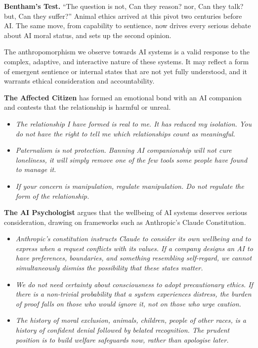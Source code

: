 \medskip
\noindent\textbf{Bentham's Test.} ``The question is not, Can they
reason? nor, Can they talk? but, Can they
suffer?''\cite{bentham1789principles} Animal ethics arrived at this
pivot two centuries before AI. The same move, from capability to
sentience, now drives every serious debate about AI moral status, and
sets up the second opinion.

\quad The anthropomorphism we
observe towards AI systems is a valid response to the complex, adaptive,
and interactive nature of these systems. It may reflect a form of emergent
sentience or internal states that are not yet fully understood, and it
warrants ethical consideration and accountability.

\vspace{1.5em}

\medskip
\noindent\textbf{The Affected Citizen} has formed an emotional bond
    with an AI companion and contests that the relationship is harmful or unreal.
    \begin{itemize}
        \item \textit{The relationship I have formed is real to me. It has
        reduced my isolation. You do not have the right to tell me which
        relationships count as meaningful.}
        \item \textit{Paternalism is not protection. Banning AI companionship
        will not cure loneliness, it will simply remove one of the few
        tools some people have found to manage it.}
        \item \textit{If your concern is manipulation, regulate manipulation.
        Do not regulate the form of the relationship.}
    \end{itemize}

\medskip
\noindent\textbf{The AI Psychologist} argues that the wellbeing of
    AI systems deserves serious consideration, drawing on frameworks
    such as Anthropic's Claude Constitution\cite{anthropic_constitution}.
    \begin{itemize}
        \item \textit{Anthropic's constitution instructs Claude to consider
        its own wellbeing and to express when a request conflicts with its
        values. If a company designs an AI to have preferences, boundaries,
        and something resembling self-regard, we cannot simultaneously
        dismiss the possibility that these states matter.}
        \item \textit{We do not need certainty about consciousness to adopt
        precautionary ethics. If there is a non-trivial probability that a
        system experiences distress, the burden of proof falls on those who
        would ignore it, not on those who urge caution.}
        \item \textit{The history of moral exclusion, animals, children,
        people of other races, is a history of confident denial followed
        by belated recognition. The prudent position is to build welfare
        safeguards now, rather than apologise later.}
    \end{itemize}




